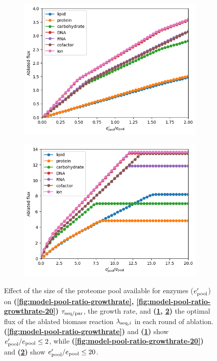 \begin{figure}
  \begin{subfigure}[htpb]{0.45\textwidth}
   \centering
   \includegraphics[width=\textwidth]{epool_ec_components}
   \caption{
   }
   \label{fig:model-pool-ablated}
  \end{subfigure}%
  \begin{subfigure}[htpb]{0.45\textwidth}
   \centering
   \includegraphics[width=\textwidth]{epool_ec_components_20}
   \caption{
   }
   \label{fig:model-pool-ablated-20}
  \end{subfigure}

  \caption[
    Effect of the size of the proteome pool available for enzymes
  ]{
    Effect of the size of the proteome pool available for enzymes ($e_{\mathrm{pool}}^{\prime}$) on \textbf{(\ref{fig:model-pool-ratio-growthrate}, \ref{fig:model-pool-ratio-growthrate-20})} $\tau_{\mathrm{seq}/\mathrm{par}}$, the growth rate, and \textbf{(\ref{fig:model-pool-ablated}, \ref{fig:model-pool-ablated-20})} the optimal flux of the ablated biomass reaction $\lambda_{\mathrm{seq},i}$ in each round of ablation.
    \textbf{(\ref{fig:model-pool-ratio-growthrate})} and \textbf{(\ref{fig:model-pool-ablated})} show $e_{\mathrm{pool}}^{\prime}/e_{\mathrm{pool}} \leq 2$, while
    \textbf{(\ref{fig:model-pool-ratio-growthrate-20})} and \textbf{(\ref{fig:model-pool-ablated-20})} show $e_{\mathrm{pool}}^{\prime}/e_{\mathrm{pool}} \leq 20$.
  }
  \label{fig:model-pool}
\end{figure}


